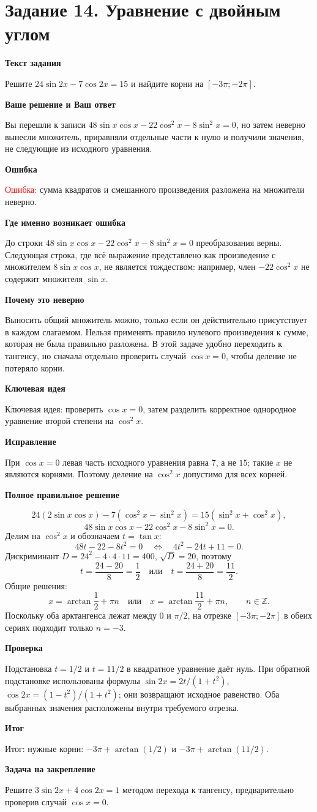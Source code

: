 \documentclass[11pt,a4paper]{article}
\newcommand{\Part}[1]{\par\medskip\noindent\textbf{#1}\par\smallskip}
\newcommand{\Task}[2]{\clearpage\phantomsection\label{task:#1}\section*{#2}}
\newcommand{\Err}[1]{\textcolor{red}{Ошибка:} #1}
\newcommand{\Idea}[1]{\textcolor{blue!60!black}{Ключевая идея:} #1}
\newcommand{\Result}[1]{\textcolor{teal!60!black}{Итог:} #1}
\begin{document}
\Task{v114t}{Задание 14. Уравнение с двойным углом}
\Part{Текст задания}
Решите $24\sin2x-7\cos2x=15$ и найдите корни на $[-3\pi;-2\pi]$.
\Part{Ваше решение и Ваш ответ}
Вы перешли к записи $48\sin x\cos x-22\cos^2x-8\sin^2x=0$, но затем неверно вынесли множитель, приравняли отдельные части к нулю и получили значения, не следующие из исходного уравнения.
\Part{Ошибка}
\Err{сумма квадратов и смешанного произведения разложена на множители неверно.}
\Part{Где именно возникает ошибка}
До строки $48\sin x\cos x-22\cos^2x-8\sin^2x=0$ преобразования верны. Следующая строка, где всё выражение представлено как произведение с множителем $8\sin x\cos x$, не является тождеством: например, член $-22\cos^2x$ не содержит множителя $\sin x$.
\Part{Почему это неверно}
Выносить общий множитель можно, только если он действительно присутствует в каждом слагаемом. Нельзя применять правило нулевого произведения к сумме, которая не была правильно разложена. В этой задаче удобно переходить к тангенсу, но сначала отдельно проверить случай $\cos x=0$, чтобы деление не потеряло корни.
\Part{Ключевая идея}
\Idea{проверить $\cos x=0$, затем разделить корректное однородное уравнение второй степени на $\cos^2x$.}
\Part{Исправление}
При $\cos x=0$ левая часть исходного уравнения равна $7$, а не $15$; такие $x$ не являются корнями. Поэтому деление на $\cos^2x$ допустимо для всех корней.
\Part{Полное правильное решение}
\[24(2\sin x\cos x)-7(\cos^2x-\sin^2x)=15(\sin^2x+\cos^2x),\]
\[48\sin x\cos x-22\cos^2x-8\sin^2x=0.\]
Делим на $\cos^2x$ и обозначаем $t=\tan x$:
\[48t-22-8t^2=0\quad\Longleftrightarrow\quad 4t^2-24t+11=0.\]
Дискриминант $D=24^2-4\cdot4\cdot11=400$, $\sqrt D=20$, поэтому
\[t=\frac{24-20}{8}=\frac12\quad\text{или}\quad t=\frac{24+20}{8}=\frac{11}{2}.\]
Общие решения:
\[x=\arctan\frac12+\pi n\quad\text{или}\quad x=\arctan\frac{11}{2}+\pi n,\qquad n\in\mathbb Z.\]
Поскольку оба арктангенса лежат между $0$ и $\pi/2$, на отрезке $[-3\pi;-2\pi]$ в обеих сериях подходит только $n=-3$.
\Part{Проверка}
Подстановка $t=1/2$ и $t=11/2$ в квадратное уравнение даёт нуль. При обратной подстановке использованы формулы $\sin2x=2t/(1+t^2)$, $\cos2x=(1-t^2)/(1+t^2)$; они возвращают исходное равенство. Оба выбранных значения расположены внутри требуемого отрезка.
\Part{Итог}
\Result{нужные корни: $-3\pi+\arctan(1/2)$ и $-3\pi+\arctan(11/2)$.}
\Part{Задача на закрепление}
Решите $3\sin2x+4\cos2x=1$ методом перехода к тангенсу, предварительно проверив случай $\cos x=0$.
\end{document}
